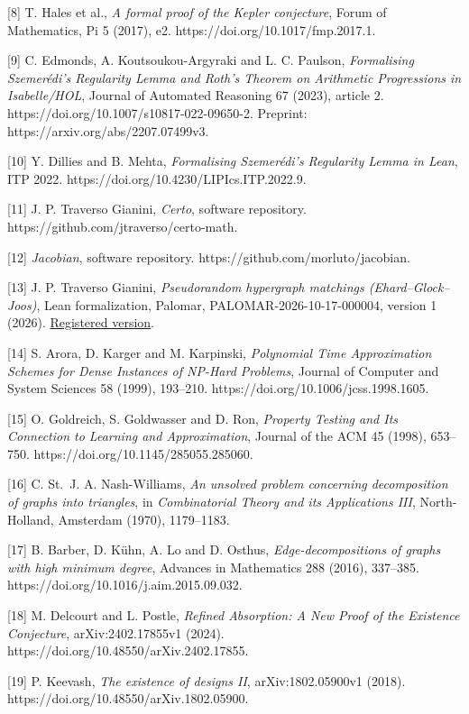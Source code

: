 \documentclass[english,11pt,a4paper]{article}
\begin{document}
{[}8{]} T. Hales et al., \emph{A formal proof of the Kepler conjecture}, Forum of Mathematics, Pi 5 (2017), e2. https://doi.org/10.1017/fmp.2017.1.

{[}9{]} C. Edmonds, A. Koutsoukou-Argyraki and L. C. Paulson, \emph{Formalising Szemerédi's Regularity Lemma and Roth's Theorem on Arithmetic Progressions in Isabelle/HOL}, Journal of Automated Reasoning 67 (2023), article 2. https://doi.org/10.1007/s10817-022-09650-2. Preprint: https://arxiv.org/abs/2207.07499v3.

{[}10{]} Y. Dillies and B. Mehta, \emph{Formalising Szemerédi's Regularity Lemma in Lean}, ITP 2022. https://doi.org/10.4230/LIPIcs.ITP.2022.9.

{[}11{]} J. P. Traverso Gianini, \emph{Certo}, software repository. https://github.com/jtraverso/certo-math.

{[}12{]} \emph{Jacobian}, software repository. https://github.com/morluto/jacobian.

{[}13{]} J. P. Traverso Gianini, \emph{Pseudorandom hypergraph matchings (Ehard--Glock--Joos)}, Lean formalization, Palomar, PALOMAR-2026-10-17-000004, version 1 (2026). \href{https://palomar-registry.org/entry.html?id=PALOMAR-2026-10-17-000004&version=1}{Registered version}.

{[}14{]} S. Arora, D. Karger and M. Karpinski, \emph{Polynomial Time Approximation Schemes for Dense Instances of NP-Hard Problems}, Journal of Computer and System Sciences 58 (1999), 193--210. https://doi.org/10.1006/jcss.1998.1605.

{[}15{]} O. Goldreich, S. Goldwasser and D. Ron, \emph{Property Testing and Its Connection to Learning and Approximation}, Journal of the ACM 45 (1998), 653--750. https://doi.org/10.1145/285055.285060.

{[}16{]} C. St.~J. A. Nash-Williams, \emph{An unsolved problem concerning decomposition of graphs into triangles}, in \emph{Combinatorial Theory and its Applications III}, North-Holland, Amsterdam (1970), 1179--1183.

{[}17{]} B. Barber, D. Kühn, A. Lo and D. Osthus, \emph{Edge-decompositions of graphs with high minimum degree}, Advances in Mathematics 288 (2016), 337--385. https://doi.org/10.1016/j.aim.2015.09.032.

{[}18{]} M. Delcourt and L. Postle, \emph{Refined Absorption: A New Proof of the Existence Conjecture}, arXiv:2402.17855v1 (2024). https://doi.org/10.48550/arXiv.2402.17855.

{[}19{]} P. Keevash, \emph{The existence of designs II}, arXiv:1802.05900v1 (2018). https://doi.org/10.48550/arXiv.1802.05900.

\endgroup
\end{document}
